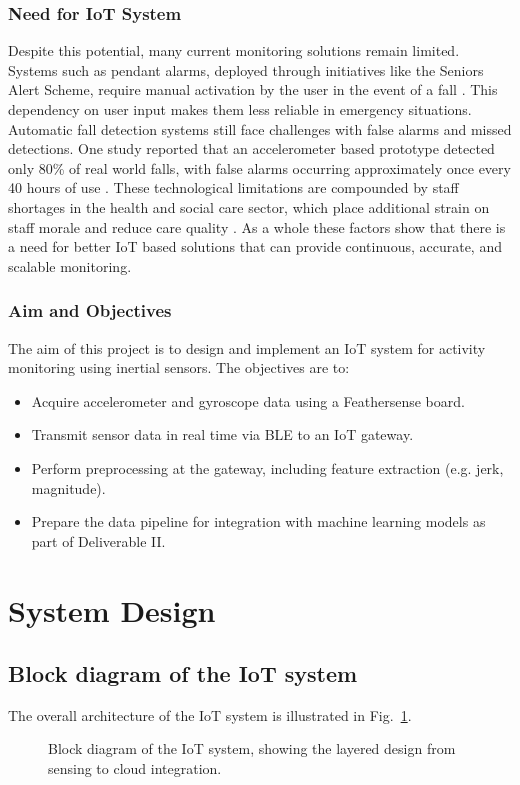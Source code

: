\documentclass[conference]{lib/IEEEtran}
\begin{document}
\subsubsection{Need for IoT System}
Despite this potential, many current monitoring solutions remain limited. Systems such as pendant alarms, deployed through initiatives like the Seniors Alert Scheme, require manual activation by the user in the event of a fall \cite{b2}. This dependency on user input makes them less reliable in emergency situations. Automatic fall detection systems still face challenges with false alarms and missed detections. One study reported that an accelerometer based prototype detected only 80\% of real world falls, with false alarms occurring approximately once every 40 hours of use \cite{b3}. These technological limitations are compounded by staff shortages in the health and social care sector, which place additional strain on staff morale and reduce care quality \cite{b4}. As a whole these factors show that there is a need for better IoT based solutions that can provide continuous, accurate, and scalable monitoring.

\subsubsection{Aim and Objectives}\label{AO}
The aim of this project is to design and implement an IoT system for activity monitoring using inertial sensors. The objectives are to:
\begin{itemize}
	\item Acquire accelerometer and gyroscope data using a Feathersense board.
	\item Transmit sensor data in real time via BLE to an IoT gateway.
	\item Perform preprocessing at the gateway, including feature extraction (e.g. jerk, magnitude).
	\item Prepare the data pipeline for integration with machine learning models as part of Deliverable II.
\end{itemize}


\section{System Design}

\subsection{Block diagram of the IoT system}
The overall architecture of the IoT system is illustrated in Fig.~\ref{fig:block_diagram}. 
\begin{figure}[h]
	\centering
	\caption{Block diagram of the IoT system, showing the layered design from sensing to cloud integration.}
	\label{fig:block_diagram}
\end{figure}
\end{document}
